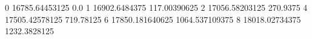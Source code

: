 0 16785.64453125 0.0
1 16902.6484375 117.00390625
2 17056.58203125 270.9375
4 17505.42578125 719.78125
6 17850.181640625 1064.537109375
8 18018.02734375 1232.3828125
